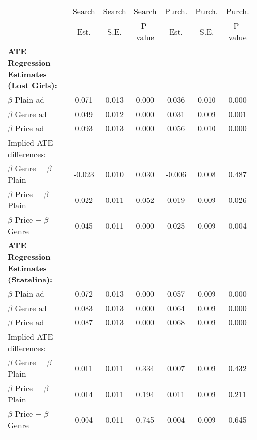 \begin{center}
\begin{tabular}{lcccccc}
\hline \noalign{\smallskip} & Search & Search & Search & Purch. & Purch. & Purch.\\
 & Est. & S.E. & P-value & Est. & S.E. & P-value\\
\noalign{\smallskip}\hline \noalign{\smallskip}\textbf{ATE Regression Estimates (Lost Girls):} &  &  &  &  &  & \\
\hspace{5pt} $\beta$ Plain ad & 0.071 & 0.013 & 0.000 & 0.036 & 0.010 & 0.000\\
\hspace{5pt} $\beta$ Genre ad & 0.049 & 0.012 & 0.000 & 0.031 & 0.009 & 0.001\\
\hspace{5pt} $\beta$ Price ad & 0.093 & 0.013 & 0.000 & 0.056 & 0.010 & 0.000\\
Implied ATE differences: &  &  &  &  &  & \\
\hspace{5pt} $\beta$ Genre $-$ $\beta$ Plain & -0.023 & 0.010 & 0.030 & -0.006 & 0.008 & 0.487\\
\hspace{5pt} $\beta$ Price $-$ $\beta$ Plain & 0.022 & 0.011 & 0.052 & 0.019 & 0.009 & 0.026\\
\hspace{5pt} $\beta$ Price $-$ $\beta$ Genre & 0.045 & 0.011 & 0.000 & 0.025 & 0.009 & 0.004\\
\textbf{ATE Regression Estimates (Stateline):} &  &  &  &  &  & \\
\hspace{5pt} $\beta$ Plain ad & 0.072 & 0.013 & 0.000 & 0.057 & 0.009 & 0.000\\
\hspace{5pt} $\beta$ Genre ad & 0.083 & 0.013 & 0.000 & 0.064 & 0.009 & 0.000\\
\hspace{5pt} $\beta$ Price ad & 0.087 & 0.013 & 0.000 & 0.068 & 0.009 & 0.000\\
Implied ATE differences: &  &  &  &  &  & \\
\hspace{5pt} $\beta$ Genre $-$ $\beta$ Plain & 0.011 & 0.011 & 0.334 & 0.007 & 0.009 & 0.432\\
\hspace{5pt} $\beta$ Price $-$ $\beta$ Plain & 0.014 & 0.011 & 0.194 & 0.011 & 0.009 & 0.211\\
\hspace{5pt} $\beta$ Price $-$ $\beta$ Genre & 0.004 & 0.011 & 0.745 & 0.004 & 0.009 & 0.645\\
\noalign{\smallskip}\hline\end{tabular}\\
\end{center}
